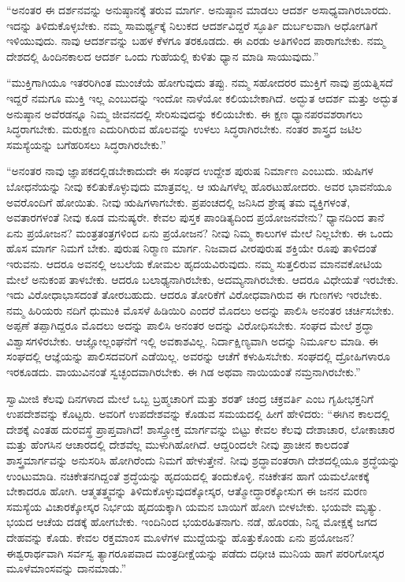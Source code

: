  “ಅನಂತರ ಈ ದರ್ಶನವನ್ನು ಅನುಷ್ಠಾನಕ್ಕೆ ತರುವ ಮಾರ್ಗ. ಅನುಷ್ಠಾನ ಮಾಡಲು ಆದರ್ಶ ಅಸಾಧ್ಯವಾಗಿರಬಾರದು. ಇದನ್ನು ತಿಳಿದುಕೊಳ್ಳಬೇಕು. ನಮ್ಮ ಸಾಮರ್ಥ್ಯಕ್ಕೆ ನಿಲುಕದ ಆದರ್ಶವಿದ್ದರೆ ಸ್ಫೂರ್ತಿ ದುರ್ಬಲವಾಗಿ ಅಧೋಗತಿಗೆ ಇಳಿಯುವುದು. ನಾವು ಆದರ್ಶವನ್ನು ಬಹಳ ಕೆಳಗೂ ತರಕೂಡದು. ಈ ಎರಡು ಅತಿಗಳಿಂದ ಪಾರಾಗಬೇಕು. ನಮ್ಮ ದೇಶದಲ್ಲಿ ಹಿಂದಿನಕಾಲದ ಆದರ್ಶ ಒಂದು ಗುಹೆಯಲ್ಲಿ ಕುಳಿತು ಧ್ಯಾನ ಮಾಡಿ ಸಾಯುವುದು.” 

 “ಮುಕ್ತಿಗಾಗಿಯೂ ಇತರರಿಗಿಂತ ಮುಂಚೆಯೆ ಹೋಗುವುದು ತಪ್ಪು. ನಮ್ಮ ಸಹೋದರರ ಮುಕ್ತಿಗೆ ನಾವು ಪ್ರಯತ್ನಿಸದೆ ಇದ್ದರೆ ನಮಗೂ ಮುಕ್ತಿ ಇಲ್ಲ ಎಂಬುದನ್ನು ಇಂದೋ ನಾಳೆಯೋ‌ ಕಲಿಯಬೇಕಾಗಿದೆ. ಅದ್ಭುತ ಆದರ್ಶ ಮತ್ತು ಅದ್ಭುತ ಅನುಷ್ಠಾನ ಅವೆರಡನ್ನೂ ನಿಮ್ಮ ಜೀವನದಲ್ಲಿ ಸೇರಿಸುವುದನ್ನು ಕಲಿಯಬೇಕು. ಈ ಕ್ಷಣ ಧ್ಯಾನಪರವಶರಾಗಲು ಸಿದ್ಧರಾಗಬೇಕು. ಮರುಕ್ಷಣ ಎದುರಿಗಿರುವ ಹೊಲವನ್ನು ಉಳಲು ಸಿದ್ಧರಾಗಿರಬೇಕು. ನಂತರ ಶಾಸ್ತ್ರದ ಜಟಿಲ ಸಮಸ್ಯೆಯನ್ನು ಬಗೆಹರಿಸಲು ಸಿದ್ಧರಾಗಿರಬೇಕು.” 

 “ಅನಂತರ ನಾವು ಜ್ಞಾಪಕದಲ್ಲಿಡಬೇಕಾದುದೇ ಈ ಸಂಘದ ಉದ್ದೇಶ ಪುರುಷ ನಿರ್ಮಾಣ ಎಂಬುದು. ಋಷಿಗಳ ಬೋಧನೆಯನ್ನು ನೀವು ಕಲಿತುಕೊಳ್ಳುವುದು ಮಾತ್ರವಲ್ಲ. ಆ ಋಷಿಗಳೆಲ್ಲ ಹೊರಟುಹೋದರು. ಅವರ ಭಾವನೆಯೂ ಅವರೊಂದಿಗೆ ಹೋಯಿತು. ನೀವು ಋಷಿಗಳಾಗಬೇಕು. ಪ್ರಪಂಚದಲ್ಲಿ ಜನಿಸಿದ ಶ್ರೇಷ್ಠ ತಮ ವ್ಯಕ್ತಿಗಳಂತೆ, ಅವತಾರಗಳಂತೆ ನೀವು ಕೂಡ ಮನುಷ್ಯರೇ. ಕೇವಲ ಪುಸ್ತಕ ಪಾಂಡಿತ್ಯದಿಂದ ಪ್ರಯೋಜನವೇನು? ಧ್ಯಾನದಿಂದ ತಾನೆ ಏನು ಪ್ರಯೋಜನ? ಮಂತ್ರತಂತ್ರಗಳಿಂದ ಏನು ಪ್ರಯೋಜನ? ನೀವು ನಿಮ್ಮ ಕಾಲುಗಳ ಮೇಲೆ ನಿಲ್ಲಬೇಕು. ಈ ಒಂದು ಹೊಸ ಮಾರ್ಗ ನಿಮಗೆ ಬೇಕು. ಪುರುಷ ನಿರ‍್ಮಾಣ ಮಾರ್ಗ. ನಿಜವಾದ ವೀರಪುರುಷ ಶಕ್ತಿಯೇ ರೂಪು ತಾಳಿದಂತೆ ಇರುವನು. ಆದರೂ ಅವನಲ್ಲಿ ಅಬಲೆಯ ಕೋಮಲ ಹೃದಯವಿರುವುದು. ನಮ್ಮ ಸುತ್ತಲಿರುವ ಮಾನವಕೋಟಿಯ ಮೇಲೆ ಅನುಕಂಪ ತಾಳಬೇಕು. ಆದರೂ ಬಲಾಢ್ಯನಾಗಿರಬೇಕು, ಅದಮ್ಯನಾಗಿರಬೇಕು. ಆದರೂ ವಿಧೇಯತೆ ಇರಬೇಕು. ಇದು ವಿರೋಧಾಭಾಸದಂತೆ ತೋರಬಹುದು. ಆದರೂ ತೋರಿಕೆಗೆ ವಿರೋಧವಾಗಿರುವ ಈ ಗುಣಗಳು ಇರಬೇಕು. ನಮ್ಮ ಹಿರಿಯರು ನದಿಗೆ ಧುಮುಕಿ ಮೊಸಳೆ ಹಿಡಿಯಿರಿ ಎಂದರೆ ಮೊದಲು ಅದನ್ನು ಪಾಲಿಸಿ ಅನಂತರ ಚರ್ಚಿಸಬೇಕು. ಅಪ್ಪಣೆ ತಪ್ಪಾಗಿದ್ದರೂ ಮೊದಲು ಅದನ್ನು ಪಾಲಿಸಿ ಅನಂತರ ಅದನ್ನು ವಿರೋಧಿಸಬೇಕು. ಸಂಘದ ಮೇಲೆ ಶ್ರದ್ಧಾ ವಿಶ್ವಾಸಗಳಿರಬೇಕು. ಆಜ್ಞೋಲ್ಲಂಘನೆಗೆ ಇಲ್ಲಿ ಅವಕಾಶವಿಲ್ಲ. ನಿರ್ದಾಕ್ಷಿಣ್ಯವಾಗಿ ಅದನ್ನು ನಿರ್ಮೂಲ ಮಾಡಿ. ಈ ಸಂಘದಲ್ಲಿ ಆಜ್ಞೆಯನ್ನು ಪಾಲಿಸದವರಿಗೆ ಎಡೆಯಿಲ್ಲ. ಅವರನ್ನು ಆಚೆಗೆ ಕಳುಹಿಸಬೇಕು. ಸಂಘದಲ್ಲಿ ದ್ರೋಹಿಗಳಾರೂ ಇರಕೂಡದು. ವಾಯುವಿನಂತೆ ಸ್ವಚ್ಛಂದವಾಗಿರಬೇಕು. ಈ ಗಿಡ ಅಥವಾ ನಾಯಿಯಂತೆ ನಮ್ರನಾಗಿರಬೇಕು.” 

 ಸ್ವಾಮೀಜಿ ಕೆಲವು ದಿನಗಳಾದ ಮೇಲೆ ಒಬ್ಬ ಬ್ರಹ್ಮಚಾರಿಗೆ ಮತ್ತು ಶರತ್ ಚಂದ್ರ ಚಕ್ರವರ್ತಿ ಎಂಬ ಗೃಹೀಭಕ್ತನಿಗೆ ಉಪದೇಶವನ್ನು ಕೊಟ್ಟರು. ಅವರಿಗೆ ಉಪದೇಶವನ್ನು ಕೊಡುವ ಸಮಯದಲ್ಲಿ ಹೀಗೆ ಹೇಳಿದರು: “ಈಗಿನ ಕಾಲದಲ್ಲಿ ದೇಶಕ್ಕೆ ಎಂತಹ ದುರವಸ್ಥೆ ಪ್ರಾಪ್ತವಾಗಿದೆ! ಶಾಸ್ತ್ರೋಕ್ತ ಮಾರ್ಗವನ್ನು ಬಿಟ್ಟು ಕೇವಲ ಕೆಲವು ದೇಶಾಚಾರ, ಲೋಕಾಚಾರ ಮತ್ತು ಹೆಂಗಸಿನ ಆಚಾರದಲ್ಲಿ ದೇಶವೆಲ್ಲ ಮುಳುಗಿಹೋಗಿದೆ. ಆದ್ದರಿಂದಲೇ ನೀವು ಪ್ರಾಚೀನ ಕಾಲದಂತೆ ಶಾಸ್ತ್ರಮಾರ್ಗವನ್ನು ಅನುಸರಿಸಿ ಹೋಗಿರೆಂದು ನಿಮಗೆ ಹೇಳುತ್ತೇನೆ. ನೀವು ಶ್ರದ್ಧಾವಂತರಾಗಿ ದೇಶದಲ್ಲಿಯೂ ಶ್ರದ್ಧೆಯನ್ನು ಉಂಟುಮಾಡಿ. ನಚಿಕೇತನಗಿದ್ದಂತೆ ಶ್ರದ್ಧೆಯನ್ನು ಹೃದಯದಲ್ಲಿ ತಂದುಕೊಳ್ಳಿ. ನಚಿಕೇತನ ಹಾಗೆ ಯಮಲೋಕಕ್ಕೆ ಬೇಕಾದರೂ ಹೋಗಿ. ಆತ್ಮತತ್ತ್ವವನ್ನು ತಿಳಿದುಕೊಳ್ಳುವುದಕ್ಕೋಸ್ಕರ, ಆತ್ಮೋದ್ಧಾರಕ್ಕೋಸುಗ ಈ ಜನನ ಮರಣ ಸಮಸ್ಯೆಯ ವಿಚಾರಕ್ಕೋಸ್ಕರ ನಿರ್ಭಯ ಹೃದಯಕ್ಕಾಗಿ ಯಮನ ಬಾಯಿಗೆ ಹೋಗಿ ಬೀಳಬೇಕು. ಭಯವೇ ಮೃತ್ಯು. ಭಯದ ಆಚೆಯ ದಡಕ್ಕೆ ಹೋಗಬೇಕು. ಇಂದಿನಿಂದ ಭಯರಹಿತನಾಗು. ನಡೆ, ಹೊರಡು, ನಿನ್ನ ಮೋಕ್ಷಕ್ಕೆ ಜಗದ ದೇಹವನ್ನು ಕೊಡು. ಕೇವಲ ರಕ್ತಮಾಂಸ ಮೂಳೆಗಳ ಮುದ್ದೆಯನ್ನು ಹೊತ್ತುಕೊಂಡು ಏನು ಪ್ರಯೋಜನ? ಈಶ್ವರಾರ್ಥವಾಗಿ ಸರ್ವಸ್ವ ತ್ಯಾಗರೂಪವಾದ ಮಂತ್ರದೀಕ್ಷೆಯನ್ನು ಪಡೆದು ದಧೀಚಿ ಮುನಿಯ ಹಾಗೆ ಪರರಿಗೋಸ್ಕರ ಮೂಳೆಮಾಂಸವನ್ನು ದಾನಮಾಡು.” 

